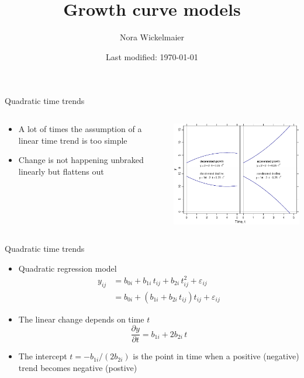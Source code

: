 \documentclass[aspectratio=169]{beamer}
\title{Growth curve models}
\author{Nora Wickelmaier}
\date{Last modified: \today}
\begin{document}
\begin{frame}{}
\thispagestyle{empty}
\titlepage
\end{frame}

\begin{frame}{Quadratic time trends}
  \begin{columns}
    \begin{column}{.35\textwidth}
    \begin{itemize}
    \item A lot of times the assumption of a linear time trend is too
      simple
    \item Change is not happening unbraked linearly but flattens out
    \end{itemize}
    \end{column}
    \begin{column}{.65\textwidth}
      \includegraphics[width=9cm]{../figures/quad}
    \end{column}
  \end{columns}
\end{frame}

\begin{frame}{Quadratic time trends}
  \begin{itemize}
    \item Quadratic regression model
\begin{align*}
  y_{ij} &= b_{0i} + b_{1i}\,t_{ij} + b_{2i}\,t^2_{ij} + \varepsilon_{ij}\\
         &= b_{0i} + (b_{1i} + b_{2i}\,t_{ij}) t_{ij}  + \varepsilon_{ij}
\end{align*}
    \item The linear change depends on time $t$
\[
  \frac{\partial y}{\partial t} = b_{1i} + 2b_{2i} \, t
\]
    \item The intercept $t = -b_{1i}/(2 b_{2i})$ is the point in time when a
      positive (negative) trend becomes negative (postive)
  \end{itemize}
\end{frame}
\end{document}
